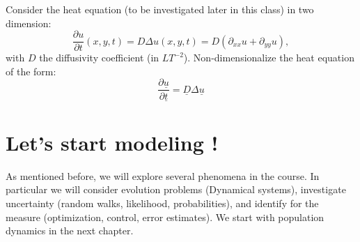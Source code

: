 \begin{Exercise}
Consider the heat equation (to be investigated later in this class) in two dimension:
\[  \displaystyle \frac{\partial u}{\partial t}(x,y,t) = D \Delta u(x,y,t)  =D ( \partial_{xx} u + \partial_{yy} u),\]
with $D$ the diffusivity coefficient (in $L T^{-2}$).
Non-dimensionalize the heat equation of the form:
\[  \displaystyle \frac{\partial \underline{u}}{\partial \underline{t}} =   \underline{D}\Delta \underline{u}\]
\dotfill

\dotfill

\dotfill

\dotfill

\dotfill

\dotfill

\dotfill

\dotfill

\dotfill

\dotfill
\end{Exercise}

\section{Let's start modeling !}
As mentioned before, we will explore several phenomena in the course. In particular we will consider evolution problems (Dynamical systems), investigate uncertainty (random walks, likelihood, probabilities), and identify for the measure (optimization, control, error estimates). We start with population dynamics in the next chapter.
